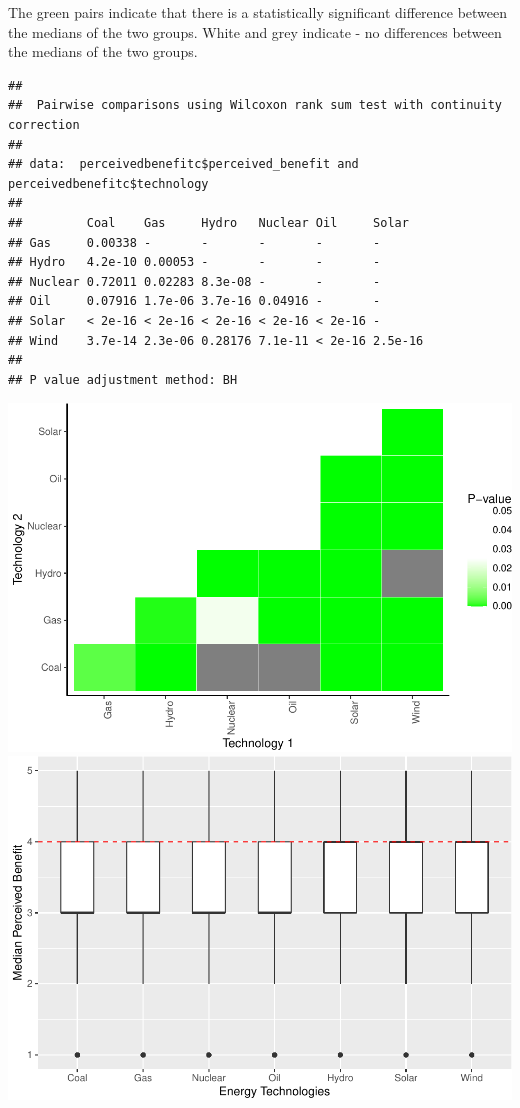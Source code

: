 \documentclass[
]{article}
\begin{document}
The green pairs indicate that there is a statistically significant
difference between the medians of the two groups. White and grey
indicate - no differences between the medians of the two groups.

\begin{verbatim}
## 
##  Pairwise comparisons using Wilcoxon rank sum test with continuity correction 
## 
## data:  perceivedbenefitc$perceived_benefit and perceivedbenefitc$technology 
## 
##         Coal    Gas     Hydro   Nuclear Oil     Solar  
## Gas     0.00338 -       -       -       -       -      
## Hydro   4.2e-10 0.00053 -       -       -       -      
## Nuclear 0.72011 0.02283 8.3e-08 -       -       -      
## Oil     0.07916 1.7e-06 3.7e-16 0.04916 -       -      
## Solar   < 2e-16 < 2e-16 < 2e-16 < 2e-16 < 2e-16 -      
## Wind    3.7e-14 2.3e-06 0.28176 7.1e-11 < 2e-16 2.5e-16
## 
## P value adjustment method: BH
\end{verbatim}

\includegraphics{Significant_results_files/figure-latex/unnamed-chunk-11-1.pdf}
\includegraphics{Significant_results_files/figure-latex/unnamed-chunk-11-2.pdf}
\end{document}

